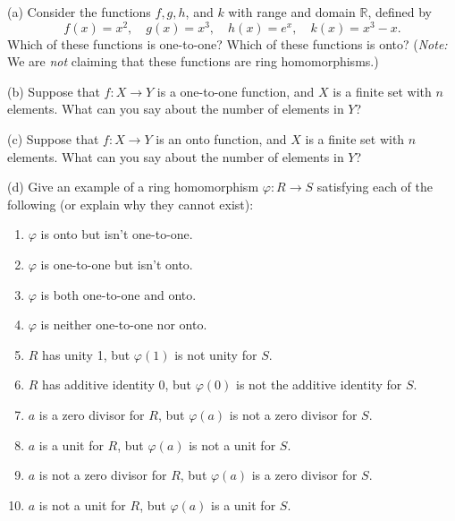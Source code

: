 
\begin{problem}[Warmup]{(a)}
    Consider the functions $f, g, h$, and $k$ with range and domain $\mathbb{R}$, defined by \[f(x) = x^2, \quad g(x) = x^3, \quad h(x) = e^x, \quad k(x) = x^3 - x.\] Which of these functions is one-to-one? Which of these functions is onto? (\emph{Note:} We are \emph{not} claiming that these functions are ring homomorphisms.)
\end{problem}
\unsolved

\begin{problem}[Warmup]{(b)}
    Suppose that $f : X \to Y$ is a one-to-one function, and $X$ is a finite set with $n$ elements. What can you say about the number of elements in $Y$?
\end{problem}
\unsolved

\begin{problem}[Warmup]{(c)}
    Suppose that $f : X \to Y$ is an onto function, and $X$ is a finite set with $n$ elements. What can you say about the number of elements in $Y$?
\end{problem}
\unsolved

\begin{problem}[Warmup]{(d)}
    Give an example of a ring homomorphism $\varphi : R \to S$ satisfying each of the following (or explain why they cannot exist):
    \begin{enumerate}
        \item[(a)] $\varphi$ is onto but isn't one-to-one.
        \item[(b)] $\varphi$ is one-to-one but isn't onto.
        \item[(c)] $\varphi$ is both one-to-one and onto.
        \item[(d)] $\varphi$ is neither one-to-one nor onto.
        \item[(e)] $R$ has unity 1, but $\varphi(1)$ is not unity for $S$.
        \item[(f)] $R$ has additive identity 0, but $\varphi(0)$ is not the additive identity for $S$.
        \item[(g)] $a$ is a zero divisor for $R$, but $\varphi(a)$ is not a zero divisor for $S$.
        \item[(h)] $a$ is a unit for $R$, but $\varphi(a)$ is not a unit for $S$.
        \item[(i)] $a$ is not a zero divisor for $R$, but $\varphi(a)$ is a zero divisor for $S$.
        \item[(j)] $a$ is not a unit for $R$, but $\varphi(a)$ is a unit for $S$.
    \end{enumerate}
\end{problem}
\unsolved

